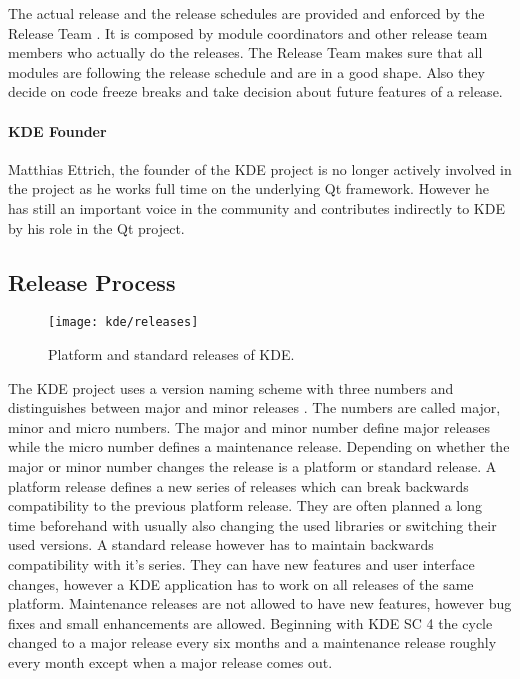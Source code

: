 The actual release and the release schedules are provided and enforced by the
Release Team \cite{KDEReleaseTeam}. It is composed by module coordinators and
other release team members who actually do the releases. The Release Team makes
sure that all modules are following the release schedule and are in a good
shape. Also they decide on code freeze breaks and take decision about future
features of a release.

\paragraph{KDE Founder}

Matthias Ettrich, the founder of the KDE project is no longer actively involved
in the project as he works full time on the underlying Qt framework. However he
has still an important voice in the community and contributes indirectly to KDE
by his role in the Qt project.


\subsection{Release Process} %

\begin{figure}[htbp]
  \centering
  \texttt{[image: kde/releases]}
  \caption{Platform and standard releases of KDE.}
\end{figure}

The KDE project uses a version naming scheme with three numbers and
distinguishes between major and minor releases
\cite{KDEReleaseTeam,KDEReleaseSchedule,KDESchedule}. The numbers are called
major, minor and micro numbers. The major and minor number define major
releases while the micro number defines a maintenance release. Depending on
whether the major or minor number changes the release is a platform or standard
release. A platform release defines a new series of releases which can break
backwards compatibility to the previous platform release. They are often
planned a long time beforehand with usually also changing the used libraries or
switching their used versions. A standard release however has to maintain
backwards compatibility with it's series. They can have new features and user
interface changes, however a KDE application has to work on all releases of the
same platform. Maintenance releases are not allowed to have new features,
however bug fixes and small enhancements are allowed. Beginning with \ac{KDE
SC} 4 the cycle changed to a major release every six months and a maintenance
release roughly every month except when a major release comes out.

